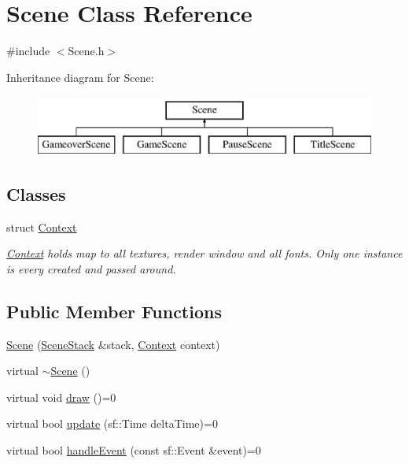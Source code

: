 \hypertarget{class_scene}{}\section{Scene Class Reference}
\label{class_scene}


{\ttfamily \#include $<$Scene.\+h$>$}

Inheritance diagram for Scene\+:\begin{figure}[H]
\begin{center}
\leavevmode
\includegraphics[height=2.000000cm]{class_scene}
\end{center}
\end{figure}
\subsection*{Classes}
\begin{DoxyCompactItemize}
\item 
struct \hyperlink{struct_scene_1_1_context}{Context}
\begin{DoxyCompactList}\small\item\em \hyperlink{struct_scene_1_1_context}{Context} holds map to all textures, render window and all fonts. Only one instance is every created and passed around. \end{DoxyCompactList}\end{DoxyCompactItemize}
\subsection*{Public Member Functions}
\begin{DoxyCompactItemize}
\item 
\hyperlink{class_scene_a9834819a1140a2c066024927e6dc9692}{Scene} (\hyperlink{class_scene_stack}{Scene\+Stack} \&stack, \hyperlink{struct_scene_1_1_context}{Context} context)
\item 
virtual \hyperlink{class_scene_a3b8cec2e32546713915f8c6303c951f1}{$\sim$\+Scene} ()
\item 
virtual void \hyperlink{class_scene_a789c16961aa1e316b2a4a05b95187546}{draw} ()=0
\item 
virtual bool \hyperlink{class_scene_a72683c984a1da2ce4f757705e93730f2}{update} (sf\+::\+Time delta\+Time)=0
\item 
virtual bool \hyperlink{class_scene_af25e4d2c998aca4e95899fb67488e815}{handle\+Event} (const sf\+::\+Event \&event)=0
\end{DoxyCompactItemize}
